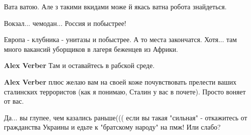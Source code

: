 \begin{itemize}
 
Вата ватою. Але з такими вкидами може й якась ватна робота знайдеться.

 
Вокзал... чемодан... Россия и побыстрее!

\begin{itemize}
 
Европа - клубника - унитазы и побыстрее. А то места закончатся. Хотя... там много вакансий уборщиков в лагеря беженцев из Африки.

 
\textbf{Alex Verber} Там и оставайтесь в рабской среде.

 
\textbf{Alex Verber} плюс желаю вам на своей коже почувствовать прелести ваших сталинских террористов (как я понимаю, Сталин у вас в почете). Просто воняет от вас.
\end{itemize}

 

Да... вы глупее, чем казались раньше((( если вы такая "сильная" - откажитесь от
гражданства Украины и едьте к "братскому народу" на пмж! Или слабо?


\end{itemize}

